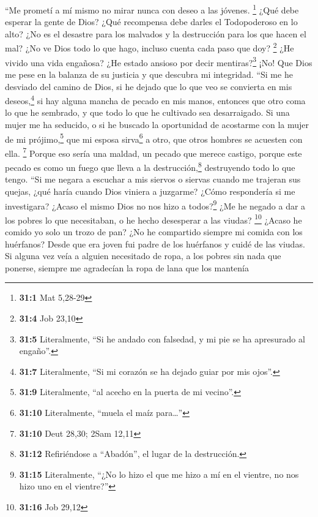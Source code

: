  ``Me prometí a mí mismo no mirar nunca con deseo a las
jóvenes. \footnote{\textbf{31:1} Mat 5,28-29}  ¿Qué debe
esperar la gente de Dios? ¿Qué recompensa debe darles el Todopoderoso en
lo alto?  ¿No es el desastre para los malvados y la
destrucción para los que hacen el mal?  ¿No ve Dios todo
lo que hago, incluso cuenta cada paso que doy? \footnote{\textbf{31:4}
  Job 23,10}  ¿He vivido una vida engañosa? ¿He estado
ansioso por decir mentiras?\footnote{\textbf{31:5} Literalmente, ``Si he
  andado con falsedad, y mi pie se ha apresurado al engaño''.}
 ¡No! Que Dios me pese en la balanza de su justicia y que
descubra mi integridad.  ``Si me he desviado del camino de
Dios, si he dejado que lo que veo se convierta en mis deseos,\footnote{\textbf{31:7}
  Literalmente, ``Si mi corazón se ha dejado guiar por mis ojos''.} si
hay alguna mancha de pecado en mis manos,  entonces que
otro coma lo que he sembrado, y que todo lo que he cultivado sea
desarraigado.  Si una mujer me ha seducido, o si he
buscado la oportunidad de acostarme con la mujer de mi
prójimo,\footnote{\textbf{31:9} Literalmente, ``al acecho en la puerta
  de mi vecino''.}  que mi esposa sirva\footnote{\textbf{31:10}
  Literalmente, ``muela el maíz para\ldots{}''} a otro, que otros
hombres se acuesten con ella. \footnote{\textbf{31:10} Deut 28,30; 2Sam
  12,11}  Porque eso sería una maldad, un pecado que
merece castigo,  porque este pecado es como un fuego que
lleva a la destrucción,\footnote{\textbf{31:12} Refiriéndose a
  ``Abadón'', el lugar de la destrucción.} destruyendo todo lo que
tengo.  ``Si me negara a escuchar a mis siervos o siervas
cuando me trajeran sus quejas,  ¿qué haría cuando Dios
viniera a juzgarme? ¿Cómo respondería si me investigara? 
¿Acaso el mismo Dios no nos hizo a todos?\footnote{\textbf{31:15}
  Literalmente, ``¿No lo hizo el que me hizo a mí en el vientre, no nos
  hizo uno en el vientre?''}  ¿Me he negado a dar a los
pobres lo que necesitaban, o he hecho desesperar a las viudas?
\footnote{\textbf{31:16} Job 29,12}  ¿Acaso he comido yo
solo un trozo de pan? ¿No he compartido siempre mi comida con los
huérfanos?  Desde que era joven fui padre de los
huérfanos y cuidé de las viudas.  Si alguna vez veía a
alguien necesitado de ropa, a los pobres sin nada que ponerse,
 siempre me agradecían la ropa de lana que los mantenía
